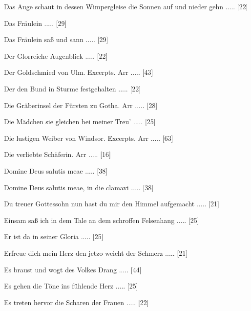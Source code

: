 \documentclass[a4paper, twocolumn, 11pt]{book}
\begin{document}
\newline 
Das Auge schaut in dessen Wimpergleise die Sonnen auf und nieder gehn ..... [22]

\newline 
Das Fräulein ..... [29]

\newline 
Das Fräulein saß und sann ..... [29]

\newline 
Der Glorreiche Augenblick ..... [22]

\newline 
Der Goldschmied von Ulm. Excerpts. Arr ..... [43]

\newline 
Der den Bund in Sturme festgehalten ..... [22]

\newline 
Die Gräberinsel der Fürsten zu Gotha. Arr ..... [28]

\newline 
Die Mädchen sie gleichen bei meiner Treu' ..... [25]

\newline 
Die lustigen Weiber von Windsor. Excerpts. Arr ..... [63]

\newline 
Die verliebte Schäferin. Arr ..... [16]

\newline 
Domine Deus salutis meae ..... [38]

\newline 
Domine Deus salutis meae, in die clamavi ..... [38]

\newline 
Du treuer Gottessohn nun hast du mir den Himmel aufgemacht ..... [21]

\newline 
Einsam saß ich in dem Tale an dem schroffen Felsenhang ..... [25]

\newline 
Er ist da in seiner Gloria ..... [25]

\newline 
Erfreue dich mein Herz den jetzo weicht der Schmerz ..... [21]

\newline 
Es braust und wogt des Volkes Drang ..... [44]

\newline 
Es gehen die Töne ins fühlende Herz ..... [25]

\newline 
Es treten hervor die Scharen der Frauen ..... [22]
\end{document}
